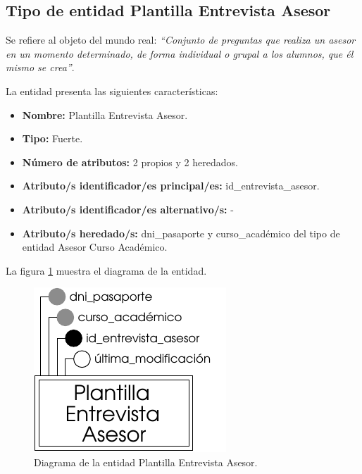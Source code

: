 \subsection{Tipo de entidad Plantilla Entrevista Asesor}

   \begin{description}

   \item[Definición] Se refiere al objeto del mundo real: \emph{``Conjunto de
   preguntas que realiza un asesor en un momento determinado, de forma
   individual o grupal a los alumnos, que él mismo se crea''}.

   \item[Características] La entidad presenta las siguientes características:
      \begin{itemize}
         \item \textbf{Nombre:} Plantilla Entrevista Asesor.
         \item \textbf{Tipo:} Fuerte.
         \item \textbf{Número de atributos:} 2 propios y 2 heredados.
         \item \textbf{Atributo/s identificador/es principal/es:} id\_entrevista\_asesor.
         \item \textbf{Atributo/s identificador/es alternativo/s:} -
         \item \textbf{Atributo/s heredado/s:} dni\_pasaporte y curso\_académico
         del tipo de entidad Asesor Curso Académico.
      \end{itemize}

   \item[Diagrama] La figura \ref{diagramaPlantEntAse} muestra el diagrama de la entidad.
   \item \begin{figure}[!ht]
            \begin{center}
            \includegraphics[]{07.Modelo_Entidad-Interrelacion/7.2.Analisis_Entidades/diagramas/plant_ent_ase.pdf}
            \caption{Diagrama de la entidad Plantilla Entrevista Asesor.}
            \label{diagramaPlantEntAse}
            \end{center}
         \end{figure}


\end{description}
